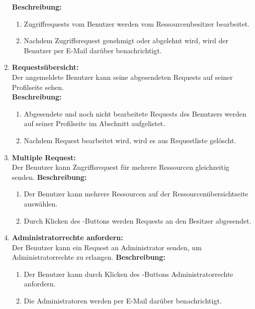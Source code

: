\documentclass[parskip=full,11pt]{scrartcl}
\def\threedigits#1{%
  \ifnum#1<10 0\fi
  \ifnum#1<1 0\fi
  \number#1}
\begin{document}
\begin{enumerate}[label={\textbf{/F\protect\threedigits{\theenumi}0/}}, leftmargin=*]
\textbf{Beschreibung:}\\
\begin{enumerate}[label=(\arabic*), leftmargin=*]
\item Zugriffrequests vom Benutzer werden vom Ressourcenbesitzer bearbeitet.
\item Nachdem Zugriffsrequest genehmigt oder abgelehnt wird, wird der Benutzer per E-Mail darüber benachrichtigt.
\end{enumerate} 
\item \label{FAB7} \colorbox{shadecolor} {\textbf{Requestsübersicht:}}\\ Der angemeldete Benutzer kann seine abgesendeten Requests auf seiner Profilseite sehen. \\
\textbf{Beschreibung:}\\
\begin{enumerate}[label=(\arabic*), leftmargin=*]
\item Abgesendete und noch nicht bearbeitete Requests des Benutzers werden auf seiner Profilseite im Abschnitt \grqq aufgelistet.
\item Nachdem Request bearbeitet wird, wird es aus Requestliste gelöscht.
\end{enumerate}
\item \label{FAB8} \colorbox{shadecolor} {\textbf{Multiple Request:}}\\ Der Benutzer kann Zugriffsrequest für mehrere Ressourcen gleichzeitig senden.
\textbf{Beschreibung:}\\
\begin{enumerate}[label=(\arabic*), leftmargin=*]
\item Der Benutzer kann mehrere Ressourcen auf der Ressourcenübersichtseite auswählen.
\item Durch Klicken des \grqq -Buttons werden Requests an den Besitzer abgesendet.
\end{enumerate}
\item \label{FAB9} \colorbox{shadecolor} {\textbf{Administratorrechte anfordern:}}\\ Der Benutzer kann ein Request an Administrator senden, um Administratorrechte zu erlangen.
\textbf{Beschreibung:}\\
\begin{enumerate}[label=(\arabic*), leftmargin=*]
\item Der Benutzer kann durch Klicken des \grqq -Buttons Administratorrechte anfordern.
\item Die Administratoren werden per E-Mail darüber benachrichtigt.

\end{enumerate}
\end{enumerate}
\end{document}
